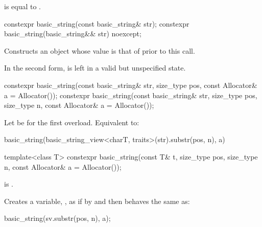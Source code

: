\begin{itemdescr}

\pnum
\ensures
{} is equal to .
\end{itemdescr}

%
\begin{itemdecl}
constexpr basic_string(const basic_string& str);
constexpr basic_string(basic_string&& str) noexcept;
\end{itemdecl}

\begin{itemdescr}
\pnum
\effects
Constructs an object whose
value is that of  prior to this call.

\pnum
\remarks
In the second form,  is left in a valid but unspecified state.
\end{itemdescr}

%
\begin{itemdecl}
constexpr basic_string(const basic_string& str, size_type pos,
                       const Allocator& a = Allocator());
constexpr basic_string(const basic_string& str, size_type pos, size_type n,
                       const Allocator& a = Allocator());
\end{itemdecl}

\begin{itemdescr}
\pnum
\effects
Let  be  for the first overload. Equivalent to:
\begin{codeblock}
basic_string(basic_string_view<charT, traits>(str).substr(pos, n), a)
\end{codeblock}
\end{itemdescr}

%
\begin{itemdecl}
template<class T>
  constexpr basic_string(const T& t, size_type pos, size_type n, const Allocator& a = Allocator());
\end{itemdecl}

\begin{itemdescr}
\pnum
\constraints
{}
is .

\pnum
\effects
Creates a variable, ,
as if by 
and then behaves the same as:
\begin{codeblock}
basic_string(sv.substr(pos, n), a);
\end{codeblock}
\end{itemdescr}

